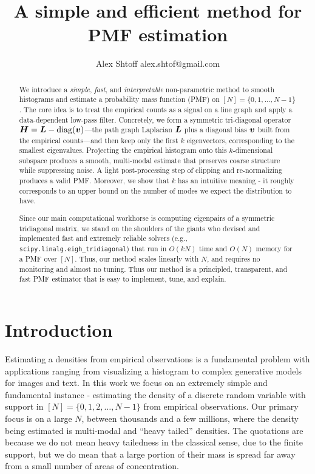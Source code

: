 \documentclass[10pt]{article} %
\title{A simple and efficient method for PMF estimation}
\author{\name Alex Shtoff \email alex.shtof@gmail.com}
\DeclareMathOperator{\diag}{diag}
\begin{document}
\maketitle

\begin{abstract}
We introduce a \emph{simple}, \emph{fast}, and \emph{interpretable} non-parametric method to smooth histograms and estimate a probability mass function (PMF) on $[N] = \{0,1, \dots, N - 1\}$. The core idea is to treat the empirical counts as a signal on a line graph and apply a data-dependent low-pass filter. Concretely, we form a symmetric tri-diagonal operator $\mH = \mL - \diag(\vv)$—the path graph Laplacian ${\bm{L}}$ plus a diagonal bias ${\bm{v}}$ built from the empirical counts—and then keep only the first $k$ eigenvectors, corresponding to the smallest eigenvalues. Projecting the empirical histogram onto this $k$-dimensional subspace produces a smooth, multi-modal estimate that preserves coarse structure while suppressing noise. A light post-processing step of clipping and re-normalizing produces a valid PMF. Moreover, we show that $k$ has an intuitive meaning - it roughly corresponds to an upper bound on the number of modes we expect the distribution to have. 

Since our main computational workhorse is computing eigenpairs of a symmetric tridiagonal matrix, we stand on the shoulders of the giants who devised and implemented fast and extremely reliable solvers (e.g., \texttt{scipy.linalg.eigh\_tridiagonal}) that run in $O(kN)$ time and $O(N)$ memory for a PMF over $[N]$. Thus, our method scales linearly with $N$, and requires no monitoring and almost no tuning. Thus our method is a principled, transparent, and fast PMF estimator that is easy to implement, tune, and explain.

\end{abstract}

\section{Introduction}
Estimating a densities from empirical observations is a fundamental problem with applications ranging from visualizing a histogram to complex generative models for images and text. In this work we focus on an extremely simple and fundamental instance - estimating the density of a discrete random variable with support in $[N] = \{0, 1, 2, \ldots, N - 1\}$ from empirical observations. Our primary focus is on a large $N$, between thousands and a few millions, where the density being estimated is multi-modal and ``heavy tailed'' densities. The quotations are because we do not mean heavy tailedness in the classical sense, due to the finite support, but we do mean that a large portion of their mass is spread far away from a small number of areas of concentration.
\end{document}
